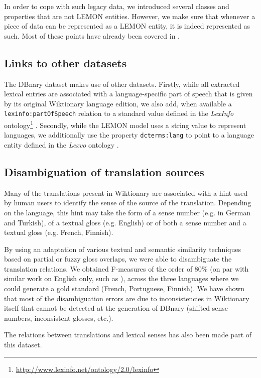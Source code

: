 \documentclass[10pt, a4paper]{article}
\begin{document}
In order to cope with such legacy data, we introduced several classes and properties that are not LEMON entities. However, we make sure that whenever a piece of data can be represented as a LEMON entity, it is indeed represented as such. Most of these points have already been covered in \cite{serasset:dbnary-swj}.


\subsection{Links to other datasets}

The DBnary dataset makes use of other datasets. Firstly, while all extracted lexical entries are associated with a language-specific part of speech that is given by its original Wiktionary language edition, we also add, when available a \texttt{lexinfo:partOfSpeech} relation to a standard value defined in the \textit{LexInfo} ontology\footnote{\url{http://www.lexinfo.net/ontology/2.0/lexinfo}} \cite{Lexinfo}. Secondly, while the LEMON model uses a string value to represent languages, we additionally use the property \texttt{dcterms:lang} to point to a language entity defined in the \emph{Lexvo} ontology \cite{deMeloWeikum2008c}.

\subsection{Disambiguation of translation sources}

Many of the translations present in Wiktionary are associated with a hint used by human users to identify the sense of the source of the translation. Depending on the language, this hint may take the form of a sense number (e.g. in German and Turkish), of a textual gloss (e.g. English) or of both a sense number and a textual gloss (e.g. French, Finnish).

By using an adaptation of various textual and semantic similarity techniques based on partial or fuzzy gloss overlaps, we were able to disambiguate the translation relations. We obtained F-measures of the order of 80\% (on par with similar work on English only, such as \cite{meyer-gurevych:2012:PAPERS}), across the three languages where we could generate a gold standard (French, Portuguese, Finnish). We have shown that most of the disambiguation errors are due to inconsistencies in Wiktionary itself that cannot be detected at the generation of DBnary (shifted sense numbers, inconsistent glosses, etc.).  

The relations between translations and lexical senses has also been made part of this dataset.
\end{document}
